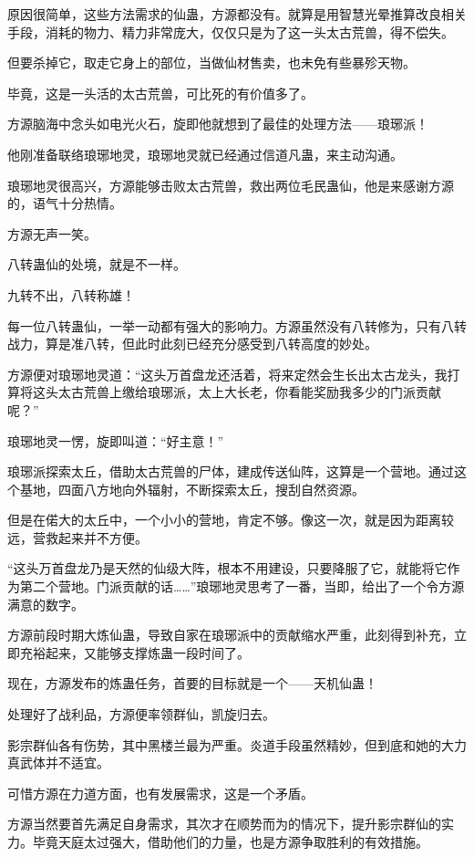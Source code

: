 \begin{this_body}
原因很简单，这些方法需求的仙蛊，方源都没有。就算是用智慧光晕推算改良相关手段，消耗的物力、精力非常庞大，仅仅只是为了这一头太古荒兽，得不偿失。

但要杀掉它，取走它身上的部位，当做仙材售卖，也未免有些暴殄天物。

毕竟，这是一头活的太古荒兽，可比死的有价值多了。

方源脑海中念头如电光火石，旋即他就想到了最佳的处理方法——琅琊派！

他刚准备联络琅琊地灵，琅琊地灵就已经通过信道凡蛊，来主动沟通。

琅琊地灵很高兴，方源能够击败太古荒兽，救出两位毛民蛊仙，他是来感谢方源的，语气十分热情。

方源无声一笑。

八转蛊仙的处境，就是不一样。

九转不出，八转称雄！

每一位八转蛊仙，一举一动都有强大的影响力。方源虽然没有八转修为，只有八转战力，算是准八转，但此时此刻已经充分感受到八转高度的妙处。

方源便对琅琊地灵道：“这头万首盘龙还活着，将来定然会生长出太古龙头，我打算将这头太古荒兽上缴给琅琊派，太上大长老，你看能奖励我多少的门派贡献呢？”

琅琊地灵一愣，旋即叫道：“好主意！”

琅琊派探索太丘，借助太古荒兽的尸体，建成传送仙阵，这算是一个营地。通过这个基地，四面八方地向外辐射，不断探索太丘，搜刮自然资源。

但是在偌大的太丘中，一个小小的营地，肯定不够。像这一次，就是因为距离较远，营救起来并不方便。

“这头万首盘龙乃是天然的仙级大阵，根本不用建设，只要降服了它，就能将它作为第二个营地。门派贡献的话……”琅琊地灵思考了一番，当即，给出了一个令方源满意的数字。

方源前段时期大炼仙蛊，导致自家在琅琊派中的贡献缩水严重，此刻得到补充，立即充裕起来，又能够支撑炼蛊一段时间了。

现在，方源发布的炼蛊任务，首要的目标就是一个——天机仙蛊！

处理好了战利品，方源便率领群仙，凯旋归去。

影宗群仙各有伤势，其中黑楼兰最为严重。炎道手段虽然精妙，但到底和她的大力真武体并不适宜。

可惜方源在力道方面，也有发展需求，这是一个矛盾。

方源当然要首先满足自身需求，其次才在顺势而为的情况下，提升影宗群仙的实力。毕竟天庭太过强大，借助他们的力量，也是方源争取胜利的有效措施。


\end{this_body}
